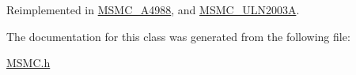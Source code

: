 Reimplemented in \hyperlink{class_m_s_m_c___a4988_a409bea28b42827c8bd7d5e5e318af21d}{M\+S\+M\+C\+\_\+\+A4988}, and \hyperlink{class_m_s_m_c___u_l_n2003_a_acdf6b6224352a90146e67ee9837d0a6f}{M\+S\+M\+C\+\_\+\+U\+L\+N2003\+A}.



The documentation for this class was generated from the following file\+:\begin{DoxyCompactItemize}
\item 
\hyperlink{_m_s_m_c_8h}{M\+S\+M\+C.\+h}\end{DoxyCompactItemize}
